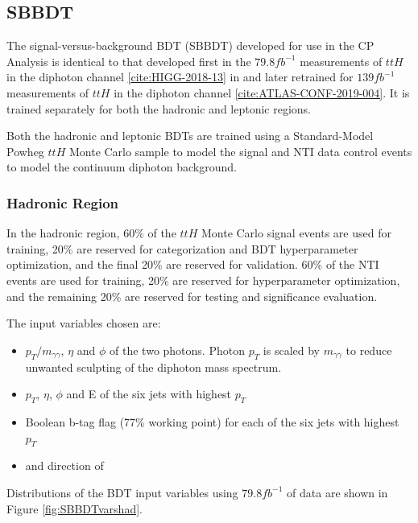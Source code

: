 \subsection{SBBDT}

The signal-versus-background BDT (SBBDT) developed for use in the CP Analysis is identical to that developed first in the $79.8 fb^{-1}$ measurements of $ttH$ in the diphoton channel \ref{cite:HIGG-2018-13} in and later retrained for $139 fb^{-1}$ measurements of $ttH$ in the diphoton channel \ref{cite:ATLAS-CONF-2019-004}. It is trained separately for both the hadronic and leptonic regions.

Both the hadronic and leptonic BDTs are trained using a Standard-Model Powheg $ttH$ Monte Carlo sample to model the signal and NTI data control events to model the continuum diphoton background.

\subsubsection{Hadronic Region} \label{sec:SBBDThad} 
In the hadronic region, 60\% of the $ttH$ Monte Carlo signal events are used for training, 20\% are reserved for categorization and BDT hyperparameter optimization, and the final 20\% are reserved for validation. 60\% of the NTI events are used for training, 20\% are reserved for hyperparameter optimization, and the remaining 20\% are reserved for testing and significance evaluation.

The input variables chosen are: 

\begin{itemize}
\item $p_T/m_{\gamma \gamma}$, $\eta$ and $\phi$ of the two photons. Photon $p_{T}$ is scaled by $m_{\gamma \gamma}$ to reduce unwanted sculpting of the diphoton mass spectrum. 
\item $p_T$, $\eta$, $\phi$ and E of the six jets with highest $p_{T}$
\item Boolean b-tag flag (77\% working point) for each of the six jets with highest $p_{T}$
\item \MET and direction of \MET
\end{itemize}

Distributions of the BDT input variables using $79.8 fb^{-1}$ of data are shown in Figure \ref{fig:SBBDTvarshad}.

